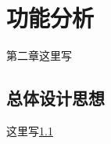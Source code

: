 
\renewcommand{\baselinestretch}{1.345}
\fontsize{12pt}{14.4pt}\selectfont
\chapter{功能分析}
第二章这里写
\section{总体设计思想}\label{section21}

这里写\ref{section21}

\endinput